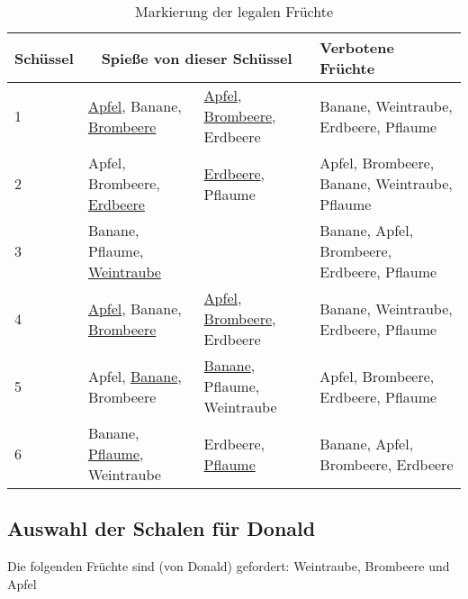 \documentclass[a4paper,10pt,ngerman]{scrartcl}
\begin{document}
\begin{table}[ht]
    \begin{center}
        \begin{tabularx}{\linewidth}{l|X|X|X}
            \textbf{Schüssel} & \multicolumn{2}{c|}{\textbf{Spieße von dieser Schüssel}} & \textbf{Verbotene Früchte}                                                                         \\
            \midrule
            1                 & \underline{Apfel}, Banane, \underline{Brombeere}         & \underline{Apfel}, \underline{Brombeere}, Erdbeere & Banane, Weintraube, Erdbeere, Pflaume         \\
            \midrule
            2                 & Apfel, Brombeere, \underline{Erdbeere}                   & \underline{Erdbeere}, Pflaume                      & Apfel, Brombeere, Banane, Weintraube, Pflaume \\
            \midrule
            3                 & Banane, Pflaume, \underline{Weintraube}                  &                                                    & Banane, Apfel, Brombeere, Erdbeere, Pflaume   \\
            \midrule
            4                 & \underline{Apfel}, Banane, \underline{Brombeere}         & \underline{Apfel}, \underline{Brombeere}, Erdbeere & Banane, Weintraube, Erdbeere, Pflaume         \\
            \midrule
            5                 & Apfel, \underline{Banane}, Brombeere                     & \underline{Banane}, Pflaume, Weintraube            & Apfel, Brombeere, Erdbeere, Pflaume           \\
            \midrule
            6                 & Banane, \underline{Pflaume}, Weintraube                  & Erdbeere, \underline{Pflaume}                      & Banane, Apfel, Brombeere, Erdbeere
        \end{tabularx}
        \caption{Markierung der legalen Früchte}
        \label{tab:alle_Schüsseln_legal}
    \end{center}
\end{table}


\subsection{Auswahl der Schalen für Donald}
Die folgenden Früchte sind (von Donald) gefordert: Weintraube, Brombeere und Apfel
\end{document}

